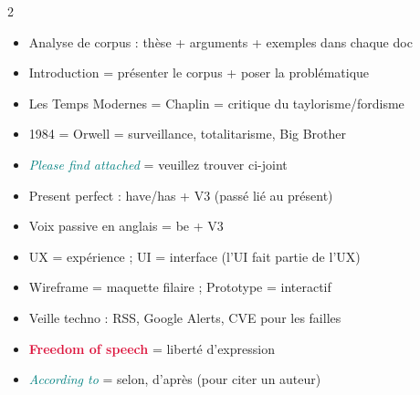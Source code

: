\documentclass[a4paper,10pt]{article}
\newcommand{\warn}[1]{\textbf{\textcolor{crimson}{#1}}}
\newcommand{\en}[1]{\textit{\textcolor{teal}{#1}}}
\begin{document}
\vspace{4pt}
\begin{tcolorbox}[basebox, colframe=brown, title=Points clés à retenir pour l'examen]
\begin{multicols}{2}
\begin{itemize}
  \item Analyse de corpus : thèse + arguments + exemples dans chaque doc
  \item Introduction = présenter le corpus + poser la problématique
  \item Les Temps Modernes = Chaplin = critique du taylorisme/fordisme
  \item 1984 = Orwell = surveillance, totalitarisme, Big Brother
  \item \en{Please find attached} = veuillez trouver ci-joint
  \item Present perfect : have/has + V3 (passé lié au présent)
  \item Voix passive en anglais = be + V3
  \item UX = expérience ; UI = interface (l'UI fait partie de l'UX)
  \item Wireframe = maquette filaire ; Prototype = interactif
  \item Veille techno : RSS, Google Alerts, CVE pour les failles
  \item \warn{Freedom of speech} = liberté d'expression
  \item \en{According to} = selon, d'après (pour citer un auteur)
\end{itemize}
\end{multicols}
\end{tcolorbox}
\end{document}
